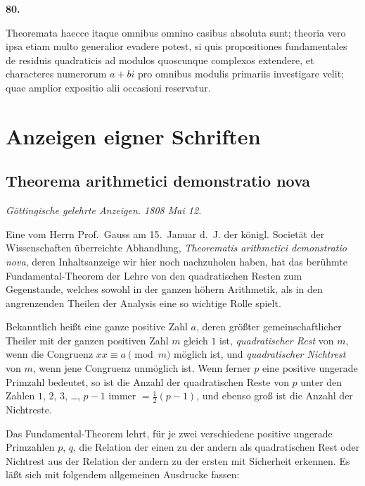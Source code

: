 \documentclass[12pt,a4paper]{article}
\theoremstyle{plain}
\theoremstyle{definition}
\theoremstyle{remark}
\begin{document}
\bigskip

\noindent\textbf{80.}

Theoremata haecce itaque omnibus omnino casibus absoluta sunt; theoria vero ipsa etiam multo generalior evadere potest, si quis propositiones fundamentales de residuis quadraticis ad modulos quoscunque complexos extendere, et characteres numerorum $a+bi$ pro omnibus modulis primariis investigare velit; quae amplior expositio alii occasioni reservatur.

\bigskip


\section*{Anzeigen eigner Schriften}

\subsection*{Theorema arithmetici demonstratio nova}

\textit{Göttingische gelehrte Anzeigen. 1808 Mai 12.}

Eine vom Herrn Prof.~Gauss am 15.~Januar d.~J. der königl. Societät der Wissenschaften überreichte Abhandlung, \textit{Theorematis arithmetici demonstratio nova}, deren Inhaltsanzeige wir hier noch nachzuholen haben, hat das berühmte Fundamental-Theorem der Lehre von den quadratischen Resten zum Gegenstande, welches sowohl in der ganzen höhern Arithmetik, als in den angrenzenden Theilen der Analysis eine so wichtige Rolle spielt.

Bekanntlich heißt eine ganze positive Zahl $a$, deren größter gemeinschaftlicher Theiler mit der ganzen positiven Zahl $m$ gleich $1$ ist, \textit{quadratischer Rest} von $m$, wenn die Congruenz $xx \equiv a \pmod{m}$ möglich ist, und \textit{quadratischer Nichtrest} von $m$, wenn jene Congruenz unmöglich ist. Wenn ferner $p$ eine positive ungerade Primzahl bedeutet, so ist die Anzahl der quadratischen Reste von $p$ unter den Zahlen $1$, $2$, $3$, \ldots, $p-1$ immer $= \frac{1}{2}(p-1)$, und ebenso groß ist die Anzahl der Nichtreste.

Das Fundamental-Theorem lehrt, für je zwei verschiedene positive ungerade Primzahlen $p$, $q$, die Relation der einen zu der andern als quadratischen Rest oder Nichtrest aus der Relation der andern zu der ersten mit Sicherheit erkennen. Es läßt sich mit folgendem allgemeinen Ausdrucke fassen:
\end{document}
